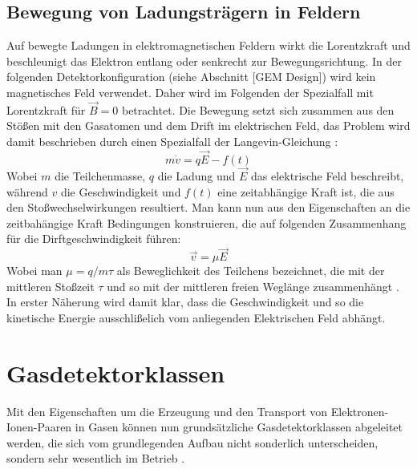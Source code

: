 		\subsection{Bewegung von Ladungsträgern in Feldern}\label{sec:Bewegung in Feldern}
		Auf bewegte Ladungen in elektromagnetischen Feldern wirkt die Lorentzkraft und beschleunigt das Elektron entlang oder senkrecht zur Bewegungsrichtung. In der folgenden Detektorkonfiguration (siehe Abschnitt [GEM Design]) wird kein magnetisches Feld verwendet. Daher wird im Folgenden der Spezialfall mit Lorentzkraft für $\vec{B}=0$ betrachtet. Die Bewegung setzt sich zusammen aus den Stößen mit den Gasatomen und dem Drift im elektrischen Feld, das Problem wird damit beschrieben durch einen Spezialfall der Langevin-Gleichung \cite{Schwabl}:
		\begin{equation*}
			m \dot{v}= q \vec{E}- f(t)
		\end{equation*}
		Wobei $m$ die Teilchenmasse, $q$ die Ladung und $\vec{E}$ das elektrische Feld beschreibt, während $v$ die Geschwindigkeit und $f(t)$ eine zeitabhängige Kraft ist, die aus den Stoßwechselwirkungen resultiert. Man kann nun aus den Eigenschaften an die zeitbahängige Kraft Bedingungen konstruieren, die auf folgenden Zusammenhang für die Dirftgeschwindigkeit führen:
		\begin{equation*}
			\vec{v}= \mu \vec{E}
		\end{equation*}
		Wobei man $\mu=q/m \tau$ als Beweglichkeit des Teilchens bezeichnet, die mit der mittleren Stoßzeit $\tau$ und so mit der mittleren freien Weglänge zusammenhängt \cite{ottnad}. In erster Näherung wird damit klar, dass die Geschwindigkeit und so die kinetische Energie ausschlißelich vom anliegenden Elektrischen Feld abhängt.
		
		\newpage
	\section{Gasdetektorklassen}
		Mit den Eigenschaften um die Erzeugung und den Transport von Elektronen-Ionen-Paaren in Gasen können nun grundsätzliche Gasdetektorklassen abgeleitet werden, die sich vom grundlegenden Aufbau nicht sonderlich unterscheiden, sondern sehr wesentlich im Betrieb \cite{Leo}.
		
